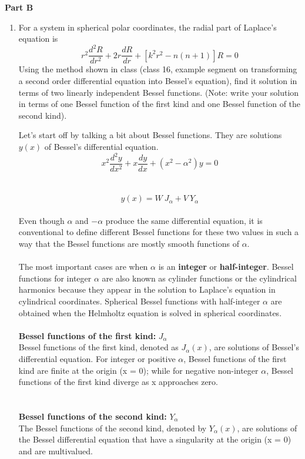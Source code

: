 \documentclass[fleqn]{article}
\begin{document}
  \textbf{Part B}
  \begin{enumerate}
    \item For a system in spherical polar coordinates, the radial part of Laplace's equation is
    $$r^2 \dfrac{d^2 R}{dr^2}+2r \dfrac{dR}{dr}+\left[k^2r^2-n(n+1)\right]R=0$$
    Using the method shown in class (class 16, example segment on transforming a second order differential equation into Bessel's equation), find it solution in terms of two linearly independent Bessel functions. (Note: write your solution in terms of one Bessel function of the first kind and one Bessel function of the second kind). 

      \textcolor{hwColor}{
        Let's start off by talking a bit about Bessel functions. They are solutions $y(x)$ of
        Bessel's differential equation. \\
        $$x^2 \dfrac{d^2 y}{dx^2}+x \dfrac{dy}{dx}+\left(x^2-\alpha^2\right)y=0$$ \\
        \\
        $$y(x)=W ~ J_{\alpha}+V ~ Y_{\alpha}$$
        \\
        Even though $\alpha$ and $-\alpha$ produce the same differential equation, it is conventional to 
        define different Bessel functions for these two values in such a way that the Bessel functions 
        are mostly smooth functions of $\alpha$. \\
        \\
        The most important cases are when $\alpha$ is an \textbf{integer} or \textbf{half-integer}. Bessel functions for integer 
        $\alpha$ are also known as cylinder functions or the cylindrical harmonics because they appear in the solution 
        to Laplace's equation in cylindrical coordinates. Spherical Bessel functions with half-integer $\alpha$ are obtained 
        when the Helmholtz equation is solved in spherical coordinates. \\
        \\
        \textbf{Bessel functions of the first kind:} $J_{\alpha}$ \\
        Bessel functions of the first kind, denoted as $J_{\alpha}(x)$, are solutions of Bessel's differential equation. 
        For integer or positive $\alpha$, Bessel functions of the first kind are finite at the origin (x = 0); while for negative 
        non-integer $\alpha$, Bessel functions of the first kind diverge as x approaches zero.
        \\
        \\
        \\
        \textbf{Bessel functions of the second kind:} $Y_{\alpha}$ \\
        The Bessel functions of the second kind, denoted by $Y_{\alpha}(x)$, are solutions of the Bessel differential equation
        that have a singularity at the origin (x = 0) and are multivalued. \\ \\
      }



\end{enumerate}
\end{document}
